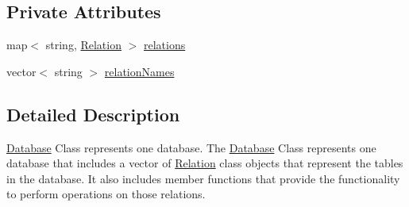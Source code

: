 \subsection*{Private Attributes}
\begin{DoxyCompactItemize}
\item 
map$<$ string, \hyperlink{class_relation}{Relation} $>$ \hyperlink{class_database_a170fceaed7e90333c306c8003320efc5}{relations}
\item 
vector$<$ string $>$ \hyperlink{class_database_ae33e101d9096adf93aeee9c95b7e41d2}{relation\-Names}
\end{DoxyCompactItemize}


\subsection{Detailed Description}
\hyperlink{class_database}{Database} Class represents one database. The \hyperlink{class_database}{Database} Class represents one database that includes a vector of \hyperlink{class_relation}{Relation} class objects that represent the tables in the database. It also includes member functions that provide the functionality to perform operations on those relations. 

